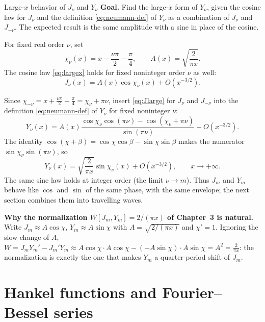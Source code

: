 \documentclass[11pt]{beamer}
\begin{document}
\begin{frame}[allowframebreaks=1.00]{Large-$x$ behavior of $J_\nu$ and $Y_\nu$}
\footnotesize
\textbf{Goal.} Find the large-$x$ form of $Y_\nu$, given the cosine law for $J_\nu$ and the
definition \eqref{eq:neumann-def} of $Y_\nu$ as a combination of $J_{\nu}$ and $J_{-\nu}$.
The expected result is the same amplitude with a sine in place of the cosine.

For fixed real order $\nu$, set
\[
 \chi_\nu(x)=x-\frac{\nu\pi}{2}-\frac\pi4,\qquad A(x)=\sqrt{\frac2{\pi x}}.
\]
The cosine law \eqref{eq:largex} holds for fixed noninteger order $\nu$ as
well:
\begin{equation}
 J_\nu(x)=A(x)\cos\chi_\nu(x)+O(x^{-3/2}).
 \label{eq:Jlarge}
\end{equation}
\par\framebreak\par
Since $\chi_{-\nu}=x+\frac{\nu\pi}2-\frac\pi4=\chi_\nu+\pi\nu$, insert \eqref{eq:Jlarge} for $J_\nu$ and $J_{-\nu}$ into the
definition \eqref{eq:neumann-def} of $Y_\nu$ for fixed noninteger $\nu$:
\[
 Y_\nu(x)=A(x)\frac{\cos\chi_\nu\cos(\pi\nu)-\cos(\chi_\nu+\pi\nu)}
                         {\sin(\pi\nu)}+O(x^{-3/2}).
\]
The identity $\cos(\chi+\beta)=\cos\chi\cos\beta-\sin\chi\sin\beta$ makes the numerator
$\sin\chi_\nu\sin(\pi\nu)$, so
\begin{equation}
 Y_\nu(x)=\sqrt{\frac2{\pi x}}\sin\chi_\nu(x)+O(x^{-3/2}),
 \qquad x\to+\infty.
 \label{eq:Ylarge}
\end{equation}
The same sine law holds at integer order (the limit $\nu\to m$). Thus $J_m$ and $Y_m$
behave like $\cos$ and $\sin$ of the same phase, with the same envelope; the next section
combines them into travelling waves.

\textbf{Why the normalization \(W[J_m,Y_m]=2/(\pi x)\) of Chapter~3 is natural.} Write \(J_m\approx A\cos\chi\),
\(Y_m\approx A\sin\chi\) with \(A=\sqrt{2/(\pi x)}\) and \(\chi'=1\). Ignoring the slow change of \(A\),
\(W=J_mY_m'-J_m'Y_m\approx A\cos\chi\cdot A\cos\chi-(-A\sin\chi)\cdot A\sin\chi=A^2=\frac{2}{\pi x}\): the
normalization is exactly the one that makes \(Y_m\) a quarter-period shift of \(J_m\).
\end{frame}

\section{Hankel functions and Fourier--Bessel series}
\end{document}
